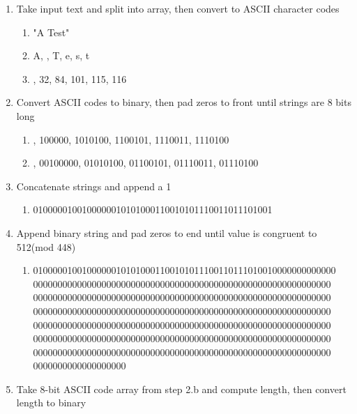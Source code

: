 \documentclass[12pt]{extarticle}
\begin{document}
\begin{enumerate}
  \item Take input text and split into array, then convert to ASCII character codes
    \begin{enumerate}
        \item "A Test"
        \item \lbrack A,    , T, e, s, t\rbrack
        \item {}, 32, 84, 101, 115, 116\rbrack
    \end{enumerate}
  \item Convert ASCII codes to binary, then pad zeros to front until strings are 8 bits long
    \begin{enumerate}
        \item {}, 100000, 1010100, 1100101, 1110011, 1110100\rbrack
        \item {}, 00100000, 01010100, 01100101, 01110011, 01110100\rbrack
    \end{enumerate}
  \item Concatenate strings and append a 1
    \begin{enumerate}
        \item 0100000100100000010101000110010101110011011101001
    \end{enumerate}
  \item Append binary string and pad zeros to end until value is congruent to 512(mod 448)
    \begin{enumerate}
        \item 01000001001000000101010001100101011100110111010010000000000000\\
        0000000000000000000000000000000000000000000000000000000000000\\
        0000000000000000000000000000000000000000000000000000000000000\\
        0000000000000000000000000000000000000000000000000000000000000\\
        0000000000000000000000000000000000000000000000000000000000000\\
        0000000000000000000000000000000000000000000000000000000000000\\
        0000000000000000000000000000000000000000000000000000000000000\\
        0000000000000000000
    \end{enumerate}
  \item Take 8-bit ASCII code array from step 2.b and compute length, then convert length to binary

\end{enumerate}
\end{document}
